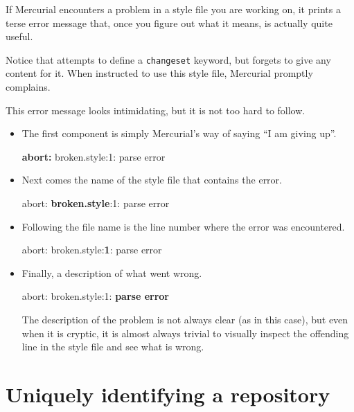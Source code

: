 {{If Mercurial encounters a problem in a style file you are working on,
it prints a terse error message that, once you figure out what it
means, is actually quite useful.


Notice that  attempts to define a
\texttt{changeset} keyword, but forgets to give any content for it.
When instructed to use this style file, Mercurial promptly complains.


This error message looks intimidating, but it is not too hard to
follow.

\begin{itemize}
\item The first component is simply Mercurial's way of saying ``I am
  giving up''.
  \begin{codesample4}
    \textbf{abort:} broken.style:1: parse error
  \end{codesample4}

\item Next comes the name of the style file that contains the error.
  \begin{codesample4}
    abort: \textbf{broken.style}:1: parse error
  \end{codesample4}

\item Following the file name is the line number where the error was
  encountered.
  \begin{codesample4}
    abort: broken.style:\textbf{1}: parse error
  \end{codesample4}

\item Finally, a description of what went wrong.
  \begin{codesample4}
    abort: broken.style:1: \textbf{parse error}
  \end{codesample4}
  The description of the problem is not always clear (as in this
  case), but even when it is cryptic, it is almost always trivial to
  visually inspect the offending line in the style file and see what
  is wrong.
\end{itemize}

\section{Uniquely identifying a repository}

}}
